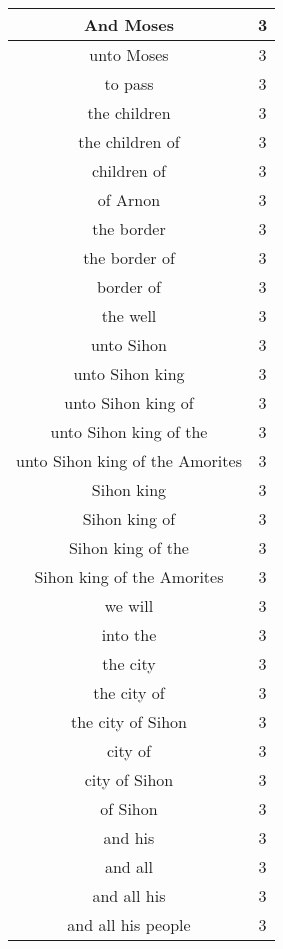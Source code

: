 \begin{center}
\begin{longtable}{|c|c|}
And Moses & 3\\ \hline 
unto Moses & 3\\ \hline 
to pass & 3\\ \hline 
the children & 3\\ \hline 
the children of & 3\\ \hline 
children of & 3\\ \hline 
of Arnon & 3\\ \hline 
the border & 3\\ \hline 
the border of & 3\\ \hline 
border of & 3\\ \hline 
the well & 3\\ \hline 
unto Sihon & 3\\ \hline 
unto Sihon king & 3\\ \hline 
unto Sihon king of & 3\\ \hline 
unto Sihon king of the & 3\\ \hline 
unto Sihon king of the Amorites & 3\\ \hline 
Sihon king & 3\\ \hline 
Sihon king of & 3\\ \hline 
Sihon king of the & 3\\ \hline 
Sihon king of the Amorites & 3\\ \hline 
we will & 3\\ \hline 
into the & 3\\ \hline 
the city & 3\\ \hline 
the city of & 3\\ \hline 
the city of Sihon & 3\\ \hline 
city of & 3\\ \hline 
city of Sihon & 3\\ \hline 
of Sihon & 3\\ \hline 
and his & 3\\ \hline 
and all & 3\\ \hline 
and all his & 3\\ \hline 
and all his people & 3\\ \hline 
\end{longtable}
\end{center}





